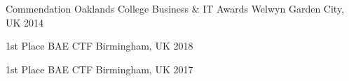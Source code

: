 



\begin{cvhonors}

  \cvhonor
    {Commendation} %
    {Oaklands College Business \& IT Awards} %
    {Welwyn Garden City, UK} %
    {2014} %

\end{cvhonors}




\begin{cvhonors}

  \cvhonor
    {1st Place} %
    {BAE CTF} %
    {Birmingham, UK} %
    {2018} %

  \cvhonor
    {1st Place} %
    {BAE CTF} %
    {Birmingham, UK} %
    {2017} %

\end{cvhonors}
